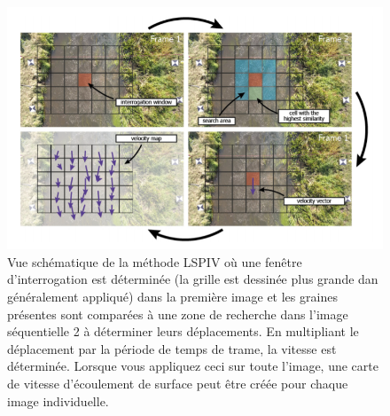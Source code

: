 \documentclass[
]{article}
\begin{document}
\begin{figure}
\includegraphics[width=1\linewidth]{images/pivprocessing} \caption{Vue schématique de la méthode LSPIV où une fenêtre d'interrogation est déterminée (la grille est dessinée plus grande dan généralement appliqué) dans la première image et les graines présentes sont comparées à une zone de recherche dans l'image séquentielle 2 à déterminer leurs déplacements. En multipliant le déplacement par la période de temps de trame, la vitesse est déterminée. Lorsque vous appliquez ceci sur toute l'image, une carte de vitesse d'écoulement de surface peut être créée pour chaque image individuelle.}\label{fig:fpivprocessing}
\end{figure}

\newpage

  
\end{document}
